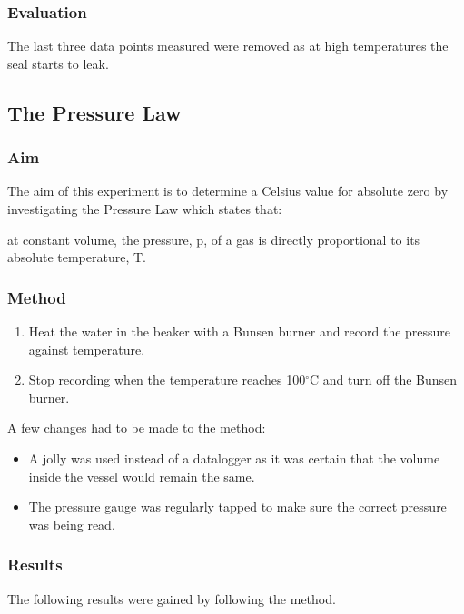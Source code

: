 \subsubsection{Evaluation}
The last three data points measured were removed as at high temperatures the seal starts to leak.

\subsection{The Pressure Law}
\setcounter{equation}{0}

\subsubsection{Aim}
The aim of this experiment is to determine a Celsius value for absolute zero by investigating the Pressure Law which states that:
\begin{quoting}
  at constant volume, the pressure, p, of a gas is directly proportional to its absolute temperature, T.
\end{quoting}

\subsubsection{Method}
\begin{enumerate}
  \item Heat the water in the beaker with a Bunsen burner and record the pressure against temperature.
  \item Stop recording when the temperature reaches 100$^\circ$C and turn off the Bunsen burner.
\end{enumerate}
A few changes had to be made to the method:
\begin{itemize}
  \item A jolly was used instead of a datalogger as it was certain that the volume inside the vessel would remain the same.
  \item The pressure gauge was regularly tapped to make sure the correct pressure was being read.
\end{itemize}

\subsubsection{Results}
The following results were gained by following the method.
\begin{center}
\end{center}

